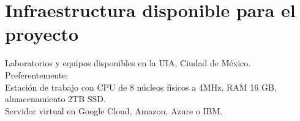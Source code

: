 \section {Infraestructura disponible para el proyecto}\noindent
Laboratorios y equipos disponibles en la UIA, Ciudad de México.\\
Preferentemente:\\
Estación de trabajo con CPU de 8 núcleos físicos a 4MHz, RAM 16 GB, almacenamiento 2TB SSD.\\
Servidor virtual en Google Cloud, Amazon, Azure o IBM.